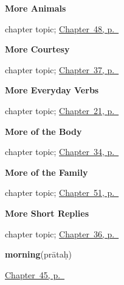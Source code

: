 \noindent\begin{minipage}[t]{\linewidth}
\raggedright
\textbf{More Animals}\par
\footnotesize chapter topic; \hyperref[ch:sa-more-animals]{Chapter~48, p.~\pageref*{ch:sa-more-animals}}
\end{minipage}\par\smallskip

\noindent\begin{minipage}[t]{\linewidth}
\raggedright
\textbf{More Courtesy}\par
\footnotesize chapter topic; \hyperref[ch:sa-courtesy-more]{Chapter~37, p.~\pageref*{ch:sa-courtesy-more}}
\end{minipage}\par\smallskip

\noindent\begin{minipage}[t]{\linewidth}
\raggedright
\textbf{More Everyday Verbs}\par
\footnotesize chapter topic; \hyperref[ch:sa-more-verbs]{Chapter~21, p.~\pageref*{ch:sa-more-verbs}}
\end{minipage}\par\smallskip

\noindent\begin{minipage}[t]{\linewidth}
\raggedright
\textbf{More of the Body}\par
\footnotesize chapter topic; \hyperref[ch:sa-limbs]{Chapter~34, p.~\pageref*{ch:sa-limbs}}
\end{minipage}\par\smallskip

\noindent\begin{minipage}[t]{\linewidth}
\raggedright
\textbf{More of the Family}\par
\footnotesize chapter topic; \hyperref[ch:sa-family-more]{Chapter~51, p.~\pageref*{ch:sa-family-more}}
\end{minipage}\par\smallskip

\noindent\begin{minipage}[t]{\linewidth}
\raggedright
\textbf{More Short Replies}\par
\footnotesize chapter topic; \hyperref[ch:sa-replies-more]{Chapter~36, p.~\pageref*{ch:sa-replies-more}}
\end{minipage}\par\smallskip

\noindent\begin{minipage}[t]{\linewidth}
\raggedright
\textbf{morning}\enspace\emph{}\enspace(prātaḥ)\par
\footnotesize \hyperref[ch:sa-times-of-the-day]{Chapter~45, p.~\pageref*{ch:sa-times-of-the-day}}
\end{minipage}\par\smallskip

